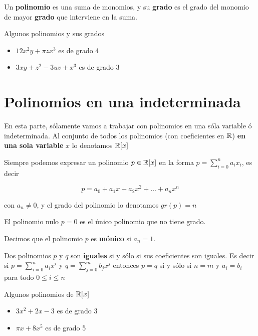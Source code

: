 \begin{definition}[Polinomio] 
Un \textbf{polinomio} es una suma de monomios, y su \textbf{grado} es el grado del monomio de mayor \textbf{grado} que interviene en la suma.
\end{definition}

\begin{example}

Algunos polinomios y sus grados

\begin{itemize}
\item $12x^2y + \pi z x^3 $ es de grado 4
\item $3xy + z^2 - 3uv + x^3$ es de grado 3
\end{itemize}
	
\end{example}



\section{Polinomios en una indeterminada}

\begin{definition} 
En esta parte, sólamente vamos a trabajar con polinomios en una sóla variable ó indeterminada.  Al conjunto de todos los polinomios (con coeficientes en $\mathbb{R}$) \textbf{en una sola variable} $x$ lo denotamos $\mathbb{R}[x]$

Siempre podemos expresar un polinomio $p \in \mathbb{R}[x]$ en la forma $p = \sum_{i=0}^n a_i x_i$, es decir

$$ p = a_0 + a_1 x + a_2 x^2 + \ldots + a_n x^n $$

con $a_n \neq 0$, y el grado del polinomio lo denotamos $gr(p) = n$

El polinomio nulo $p=0$ es el único polinomio que no tiene grado.

Decimos que el polinomio $p$ es \textbf{mónico} si $a_n = 1$.

Dos polinomios $p$  y $q$ son \textbf{iguales} si y sólo si sus coeficientes son iguales.  Es decir si $p = \sum_{i=0}^n a_i x^i$ y $q = \sum_{j=0}^m b_j x^j$ entonces $p=q$ si y sólo si $n=m$ y $a_i = b_i$ para todo $0 \leq i \leq n$
\end{definition}

\begin{example}
Algunos polinomios de $\mathbb{R}[x]$
\begin{itemize}

\item $3x^2 + 2x -3$ es de grado 3
\item $\pi x + 8x^5 $ es de grado 5
\end{itemize}

\end{example}

